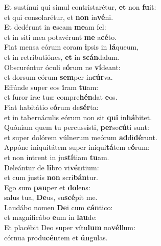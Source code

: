 \oddverse Et sustínui qui simul contristarétur, \textbf{et} non \textbf{fu}it:~\*\\
\oddverse et qui consolarétur, et \textbf{non} in\textbf{vé}ni.\\
\evenverse Et dedérunt in \textbf{e}scam \textbf{me}am fel:~\*\\
\evenverse et in siti mea potavérunt \textbf{me} a\textbf{cé}to.\\
\oddverse Fiat mensa eórum coram \textbf{i}psis in \textbf{lá}queum,~\*\\
\oddverse et in retributiónes, \textbf{et} in \textbf{scán}dalum.\\
\evenverse Obscuréntur óculi e\textbf{ó}rum ne \textbf{ví}deant:~\*\\
\evenverse et dorsum eórum \textbf{sem}per in\textbf{cúr}va.\\
\oddverse Effúnde super eos \textbf{i}ram \textbf{tu}am:~\*\\
\oddverse et furor iræ tuæ compre\textbf{hén}dat \textbf{e}os.\\
\evenverse Fiat habitátio e\textbf{ó}rum de\textbf{sér}ta:~\*\\
\evenverse et in tabernáculis eórum non sit \textbf{qui} in\textbf{há}bitet.\\
\oddverse Quóniam quem tu percussísti, \textbf{per}se\textbf{cú}ti sunt:~\*\\
\oddverse et super dolórem vúlnerum meórum \textbf{ad}di\textbf{dé}runt.\\
\evenverse Appóne iniquitátem super iniqui\textbf{tá}tem e\textbf{ó}rum:~\*\\
\evenverse et non intrent in ju\textbf{stí}tiam \textbf{tu}am.\\
\oddverse Deleántur de \textbf{li}bro vi\textbf{vén}tium:~\*\\
\oddverse et cum justis \textbf{non} scri\textbf{bán}tur.\\
\evenverse Ego sum \textbf{pau}per et \textbf{do}lens:~\*\\
\evenverse salus tua, \textbf{De}us, su\textbf{scé}pit me.\\
\oddverse Laudábo nomen \textbf{De}i cum \textbf{cán}tico:~\*\\
\oddverse et magnificábo \textbf{e}um in \textbf{lau}de:\\
\evenverse Et placébit Deo super vítu\textbf{lum} no\textbf{vél}lum:~\*\\
\evenverse córnua produ\textbf{cén}tem et \textbf{ún}gulas.\\
